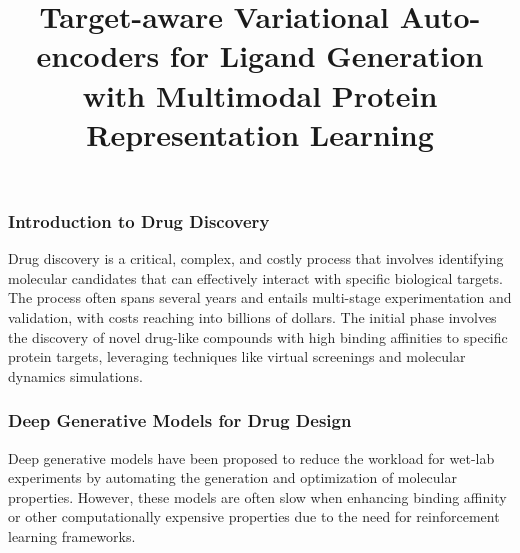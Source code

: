 \documentclass[11pt,xcolor={dvipsnames},hyperref={pdftex,pdfpagemode=UseNone,hidelinks,pdfdisplaydoctitle=true},usepdftitle=false]{beamer}
\begin{document}
\title{Target-aware Variational Auto-encoders for Ligand Generation with Multimodal Protein Representation Learning}
%
\frame{\titlepage}

\begin{frame}
    \frametitle{Introduction to Drug Discovery}
    Drug discovery is a critical, complex, and costly process that involves identifying molecular candidates that can effectively interact with specific biological targets. The process often spans several years and entails multi-stage experimentation and validation, with costs reaching into billions of dollars. The initial phase involves the discovery of novel drug-like compounds with high binding affinities to specific protein targets, leveraging techniques like virtual screenings and molecular dynamics simulations.
\end{frame}
    
    
\begin{frame}
    \frametitle{Deep Generative Models for Drug Design}
    Deep generative models have been proposed to reduce the workload for wet-lab experiments by automating the generation and optimization of molecular properties. However, these models are often slow when enhancing binding affinity or other computationally expensive properties due to the need for reinforcement learning frameworks.
    
\end{frame}
\end{document}
